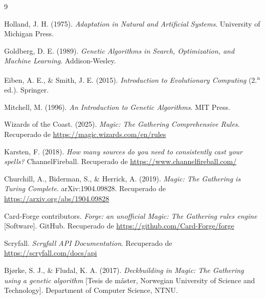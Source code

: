 
\begin{thebibliography}{9}


Holland, J. H. (1975). \textit{Adaptation in Natural and Artificial Systems}. University of Michigan Press.

Goldberg, D. E. (1989). \textit{Genetic Algorithms in Search, Optimization, and Machine Learning}. Addison-Wesley.

Eiben, A. E., \& Smith, J. E. (2015). \textit{Introduction to Evolutionary Computing} (2.\textsuperscript{a} ed.). Springer.

Mitchell, M. (1996). \textit{An Introduction to Genetic Algorithms}. MIT Press.


Wizards of the Coast. (2025). \textit{Magic: The Gathering Comprehensive Rules}. Recuperado de \url{https://magic.wizards.com/en/rules}

Karsten, F. (2018). \textit{How many sources do you need to consistently cast your spells?} ChannelFireball. Recuperado de \url{https://www.channelfireball.com/}

Churchill, A., Biderman, S., \& Herrick, A. (2019). \textit{Magic: The Gathering is Turing Complete}. arXiv:1904.09828. Recuperado de \url{https://arxiv.org/abs/1904.09828}


Card-Forge contributors. \textit{Forge: an unofficial Magic: The Gathering rules engine} [Software]. GitHub. Recuperado de \url{https://github.com/Card-Forge/forge}

Scryfall. \textit{Scryfall API Documentation}. Recuperado de \url{https://scryfall.com/docs/api}


Bjørke, S. J., \& Fludal, K. A. (2017). \textit{Deckbuilding in Magic: The Gathering using a genetic algorithm} [Tesis de máster, Norwegian University of Science and Technology]. Department of Computer Science, NTNU.


\end{thebibliography}

